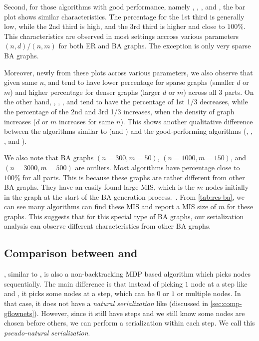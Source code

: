 Second, for those algorithms with good performance, namely \onlinemis, \redumis, \isco, and \lwd, the bar plot shows similar characteristics. The percentage for the 1st third is generally low, while the 2nd third is high, and the 3rd third is higher and close to $100\%$. This characteristics are observed in most settings accross various parameters $(n,d)$/$(n,m)$ for both ER and BA graphs. The exception is only very sparse BA graphs.

Moreover, newly from these plots across various parameters, we also observe that given same $n$, \deggreedy and \gflownets tend to have lower percentage for sparse graphs (smaller $d$ or $m$) and higher percentage for denser graphs (larger $d$ or $m$) across all $3$ parts. On the other hand, \onlinemis, \redumis, \isco, and \lwd tend to have the percentage of 1st 1/3 decreases, while the percentage of the 2nd and 3rd 1/3 increases, when the density of graph increases ($d$ or $m$ increases for same $n$). This shows another qualitative difference between the algorithms similar to \deggreedy (\deggreedy and \gflownets) and the good-performing algorithms (\onlinemis, \redumis, \isco, and \lwd).

We also note that BA graphs $(n=300, m=50)$, $(n=1000, m=150)$, and $(n=3000, m=500)$ are outliers. Most algorithms have percentage close to $100\%$ for all parts. This is because these graphs are rather different from other BA graphs. They have an easily found large MIS, which is the $m$ nodes initially in the graph at the start of the BA generation process.~\citep{albert2002statistical}. From \cref{tab:res-ba}, we can see many algorithms can find these MIS and report a MIS size of $m$ for these graphs. This suggests that for this special type of BA graphs, our serialization analysis can observe different characteristics from other BA graphs.

\subsection{Comparison between \deggreedy and \lwd}
\label{sec:comparison-lwd}
\lwd, similar to \gflownets, is also a non-backtracking MDP based algorithm which picks nodes sequentially. The main difference is that instead of picking $1$ node at a step like \deggreedy and \gflownets, it picks some nodes at a step, which can be $0$ or $1$ or multiple nodes. In that case, it does not have a \emph{natural serialization} like \gflownets (discussed in \cref{sec:comp-gflownets}). However, since it still have steps and we still know some nodes are chosen before others, we can perform a serialization within each step. We call this \emph{pseudo-natural serialization}.

